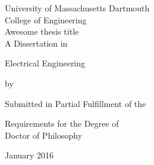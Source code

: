 
\thispagestyle{empty}
\doublespacing
\begin{center}

University of Massachusetts Dartmouth \\
College of Engineering \\


\vspace*{5em}
{\sc Awesome thesis title} \\

\vspace*{5em}
A Dissertation in 

Electrical Engineering 

by

\authorname

\vspace*{7em}
Submitted in Partial Fulfillment of the 

Requirements for the Degree of \\ Doctor of Philosophy 

\vfill
January 2016

\end{center}
\restoregeometry
